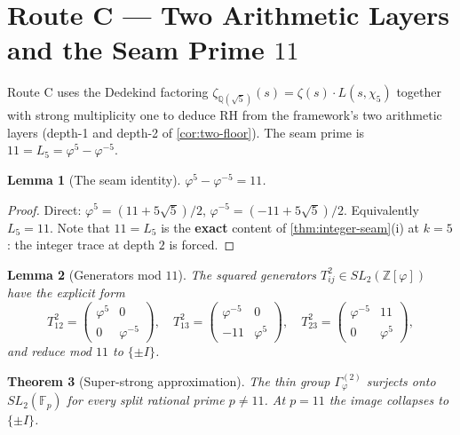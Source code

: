 \documentclass[11pt,a4paper]{article}
\theoremstyle{plain}
\newtheorem{theorem}{Theorem}[section]
\newtheorem{lemma}[theorem]{Lemma}
\theoremstyle{definition}
\theoremstyle{remark}
\numberwithin{equation}{section}
\providecommand{\Z}{\mathbb{Z}}
\providecommand{\Q}{\mathbb{Q}}
\providecommand{\F}{\mathbb{F}}
\providecommand{\vp}{\varphi}
\providecommand{\Lk}{L}
\begin{document}
\section{Route C --- Two Arithmetic Layers and the Seam Prime $11$}
\label{sec:route-c}

Route C uses the Dedekind factoring
$\zeta_{\Q(\sqrt{5})}(s) = \zeta(s) \cdot L(s, \chi_5)$ together
with strong multiplicity one to deduce RH from the framework's
two arithmetic layers (depth-1 and depth-2 of \cref{cor:two-floor}).
The seam prime is $11 = \Lk_5 = \vp^5 - \vp^{-5}$.

\begin{lemma}[The seam identity]
\label{lem:seam-11}
$\vp^5 - \vp^{-5} = 11$.
\end{lemma}

\begin{proof}
Direct: $\vp^5 = (11 + 5\sqrt{5})/2$, $\vp^{-5} = (-11 + 5\sqrt{5})/2$.
Equivalently $L_5 = 11$.  Note that $11 = L_5$ is the
\textbf{exact} content of \cref{thm:integer-seam}(i) at $k = 5$:
the integer trace at depth $2$ is forced.
\end{proof}

\begin{lemma}[Generators mod $11$]
\label{lem:generators-mod11}
The squared generators $T_{ij}^2 \in SL_2(\Z[\vp])$ have the
explicit form
\begin{equation}
  T_{12}^2 = \begin{pmatrix} \vp^5 & 0 \\ 0 & \vp^{-5} \end{pmatrix},
  \quad
  T_{13}^2 = \begin{pmatrix} \vp^{-5} & 0 \\ -11 & \vp^5 \end{pmatrix},
  \quad
  T_{23}^2 = \begin{pmatrix} \vp^{-5} & 11 \\ 0 & \vp^5 \end{pmatrix},
  \label{eq:squared-gens}
\end{equation}
and reduce mod $11$ to $\{\pm I\}$.
\end{lemma}

\begin{theorem}[Super-strong approximation]
\label{thm:ssa}
The thin group $\Gamma_\vp^{(2)}$ surjects onto $SL_2(\F_p)$ for
every split rational prime $p \ne 11$.  At $p = 11$ the image
collapses to $\{\pm I\}$.
\end{theorem}
\end{document}
